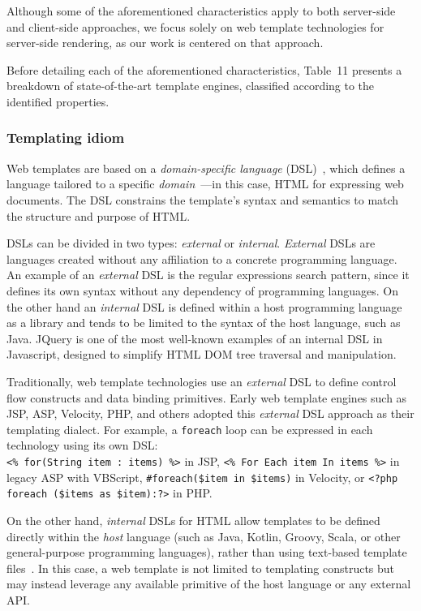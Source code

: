 Although some of the aforementioned characteristics apply to both server-side 
and client-side approaches, we focus solely on web template technologies for 
server-side rendering, as our work is centered on that approach.

Before detailing each of the aforementioned characteristics, Table~11 presents 
a breakdown of state-of-the-art template engines, classified according to the 
identified properties.

\subsubsection{Templating idiom}

Web templates are based on a \textit{domain-specific language}
(DSL)~\cite{landin1966next}, which defines a language tailored to a specific
\textit{domain}~\cite{evans2004domain}—in this case, HTML for expressing web
documents.
The DSL constrains the template's syntax and semantics to match the structure
and purpose of HTML.

DSLs can be divided in two types: \textit{external} or
\textit{internal}\cite{dslbook}.
\textit{External} DSLs are languages created without any affiliation to a
concrete programming language.
An example of an \textit{external} DSL is the regular expressions search
pattern\cite{thompson1968}, since it defines its own syntax without any
dependency of programming languages. 
On the other hand an \textit{internal} DSL is defined within a host programming
language as a library and tends to be limited to the syntax of the host language,
such as Java.
JQuery\cite{resig2007pro} is one of the most well-known examples of an internal
DSL in Javascript, designed to simplify HTML DOM\cite{dom} tree traversal and
manipulation.

Traditionally, web template technologies use an \textit{external} DSL to define
control flow constructs and data binding primitives. Early web template engines
such as JSP, ASP, Velocity, PHP, and others adopted this \textit{external} DSL
approach as their templating dialect.
For example, a \texttt{foreach} loop can be expressed in each technology using its 
own DSL:
\\\texttt{<\% for(String item : items) \%>} in JSP, \texttt{<\% For Each item 
In items \%>} in legacy ASP with VBScript, \texttt{\#foreach(\$item in \$items)} in 
Velocity, or \texttt{<?php foreach (\$items as \$item):?>} in PHP.

On the other hand, \textit{internal} DSLs for HTML allow templates to be defined 
directly within the \emph{host} language (such as Java, Kotlin, Groovy, Scala, or 
other general-purpose programming languages), rather than using text-based 
template files~\cite{carvalho2019hot}. In this case, a web template is not limited 
to templating constructs but may instead leverage any available primitive of the 
host language or any external API.

